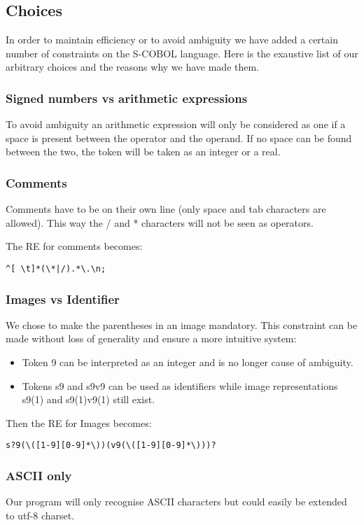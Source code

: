 \subsection{Choices}

In order to maintain efficiency or to avoid ambiguity we have added a certain number of constraints on the S-COBOL language. Here is the exaustive list of our arbitrary choices and the reasons why we have made them.

\subsubsection{Signed numbers vs arithmetic expressions}

To avoid ambiguity an arithmetic expression will only be considered as one if a space is present between the operator and the operand. If no space can be found between the two, the token will be taken as an integer or a real.

\subsubsection{Comments}
\label{sec:impl:choices:comments}

Comments have to be on their own line (only space and tab characters are allowed). This way the / and * characters will not be seen as operators.

The RE for comments becomes:

\begin{verbatim}
^[ \t]*(\*|/).*\.\n;
\end{verbatim}

\subsubsection{Images vs Identifier}

We chose to make the parentheses in an image mandatory. This constraint can be made without loss of generality and ensure a more intuitive system:

\begin{itemize}
	\item Token 9 can be interpreted as an integer and is no longer cause of ambiguity.
	\item Tokens s9 and s9v9 can be used as identifiers while image representations s9(1) and s9(1)v9(1) still exist.  
\end{itemize}

Then the RE for Images becomes:

\begin{verbatim}
s?9(\([1-9][0-9]*\))(v9(\([1-9][0-9]*\)))?
\end{verbatim}

\subsubsection{ASCII only}

Our program will only recognise ASCII characters but could easily be extended to utf-8 charset.





